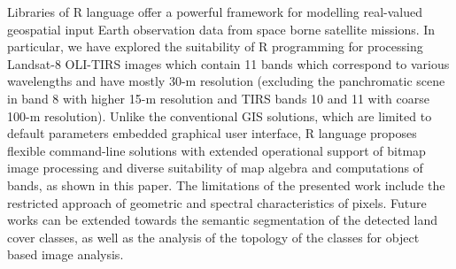 \documentclass[applsci,article,submit,pdftex,moreauthors]{Definitions/mdpi}
\begin{document}
Libraries of R language offer a powerful framework for modelling real-valued geospatial input Earth observation data from space borne satellite missions. In particular, we have explored the suitability of R programming for processing Landsat-8 OLI-TIRS images which contain 11 bands which correspond to various wavelengths and have mostly 30-m resolution (excluding the panchromatic scene in band 8 with higher 15-m resolution and TIRS bands 10 and 11 with coarse 100-m resolution). Unlike the conventional GIS solutions, which are limited to default parameters embedded graphical user interface, R language proposes flexible command-line solutions with extended operational support of bitmap image processing and diverse suitability of map algebra and computations of bands, as shown in this paper. The limitations of the presented work include the restricted approach of geometric and spectral characteristics of pixels. Future works can be extended towards the semantic segmentation of the detected land cover classes, as well as the analysis of the topology of the classes for object based image analysis.








\end{document}
